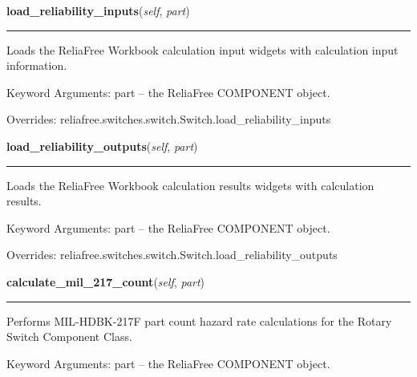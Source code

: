 \hspace{.8\funcindent}\begin{boxedminipage}{\funcwidth}

    \raggedright \textbf{load\_reliability\_inputs}(\textit{self}, \textit{part})

    \vspace{-1.5ex}

    \rule{\textwidth}{0.5\fboxrule}
\setlength{\parskip}{2ex}
    Loads the ReliaFree Workbook calculation input widgets with calculation
    input information.

    Keyword Arguments: part -- the ReliaFree COMPONENT object.

\setlength{\parskip}{1ex}
      Overrides: reliafree.switches.switch.Switch.load\_reliability\_inputs

    \end{boxedminipage}

    \vspace{0.5ex}

\hspace{.8\funcindent}\begin{boxedminipage}{\funcwidth}

    \raggedright \textbf{load\_reliability\_outputs}(\textit{self}, \textit{part})

    \vspace{-1.5ex}

    \rule{\textwidth}{0.5\fboxrule}
\setlength{\parskip}{2ex}
    Loads the ReliaFree Workbook calculation results widgets with 
    calculation results.

    Keyword Arguments: part -- the ReliaFree COMPONENT object.

\setlength{\parskip}{1ex}
      Overrides: reliafree.switches.switch.Switch.load\_reliability\_outputs

    \end{boxedminipage}

    \label{reliafree:switches:rotary:Rotary:calculate_mil_217_count}

    \vspace{0.5ex}

\hspace{.8\funcindent}\begin{boxedminipage}{\funcwidth}

    \raggedright \textbf{calculate\_mil\_217\_count}(\textit{self}, \textit{part})

    \vspace{-1.5ex}

    \rule{\textwidth}{0.5\fboxrule}
\setlength{\parskip}{2ex}
    Performs MIL-HDBK-217F part count hazard rate calculations for the 
    Rotary Switch Component Class.

    Keyword Arguments: part -- the ReliaFree COMPONENT object.

\setlength{\parskip}{1ex}
    \end{boxedminipage}

